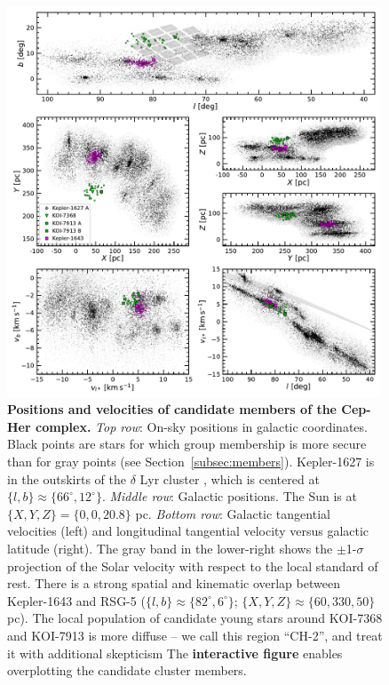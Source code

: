 \documentclass[12pt,twocolumn,linenumbers]{aastex63}
\begin{document}
\begin{figure}[t]
	\begin{center}
		\leavevmode
		\includegraphics[width=0.99\textwidth]{f1.pdf}
	\end{center}
	\vspace{-0.7cm}
	\caption{
  {\bf Positions and velocities of candidate members of the Cep-Her
  complex.}
  {\it Top row}: On-sky positions in galactic coordinates.  Black
  points are stars for which group membership is more secure than for
  gray points (see Section~\ref{subsec:members}).
  Kepler-1627 is in the outskirts of the $\delta$ Lyr cluster
  \citep{bouma_kep1627_2022}, which is centered at $\{ l, b\} \approx
  \{ 66^\circ, 12^\circ\}$.
  {\it Middle row}: Galactic positions.  The Sun is at $\{X, Y, Z\} =
  \{0, 0, 20.8\}$ pc.
  {\it Bottom row}: Galactic tangential velocities (left) and
  longitudinal tangential velocity versus galactic latitude (right).
  The gray band in the lower-right shows the $\pm$1-$\sigma$
  projection of the Solar velocity with respect to the local standard
  of rest.
  There is a strong spatial and kinematic overlap between Kepler-1643
  and RSG-5 ($\{ l, b\} \approx \{ 82^\circ,
  6^\circ\}$; $\{ X, Y, Z\} \approx \{60, 330, 50\} $ pc).  The
  local population of candidate young stars around KOI-7368 and
  KOI-7913 is more diffuse -- we call this region ``CH-2'',
  and treat it with additional skepticism
  The {\bf interactive figure} enables overplotting the candidate
  cluster members.
	\label{fig:XYZvtang}
	}
\end{figure}
\end{document}
